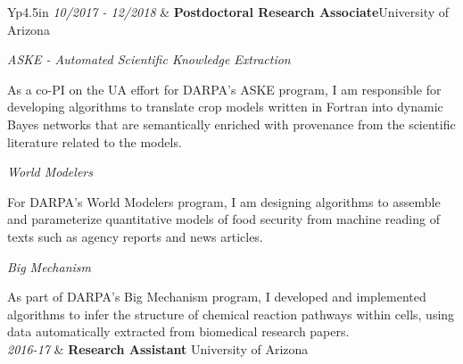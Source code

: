 \documentclass[final,oneside,11pt]{memoir}
\begin{document}
\begin{ctabular}{Yp{4.5in}}
    \emph{10/2017 - 12/2018} & \textsf{\textbf{Postdoctoral Research Associate}}\hfill \textsf{University of Arizona}\newline


      \emph{ASKE - Automated Scientific Knowledge Extraction}\newline

        As a co-PI on the UA effort for DARPA's ASKE program, I am responsible
        for developing algorithms to translate crop models written in Fortran into
        dynamic Bayes networks that are semantically enriched with provenance from the
        scientific literature related to the models.\newline

      \emph{World Modelers}\newline

        For DARPA's World Modelers program, I am designing algorithms to
        assemble and parameterize quantitative models of food security from machine
        reading of texts such as agency reports and news
        articles.\newline

      \emph{Big Mechanism}\newline

        As part of DARPA's Big Mechanism program, I developed and
        implemented algorithms to infer the structure of chemical reaction pathways
        within cells, using data automatically extracted from biomedical research
        papers.
  \\\addlinespace
    \textit{2016-17} & \textsf{\textbf{Research Assistant}}\hfill \textsf{ University of Arizona}\\


\end{ctabular}
\end{document}
